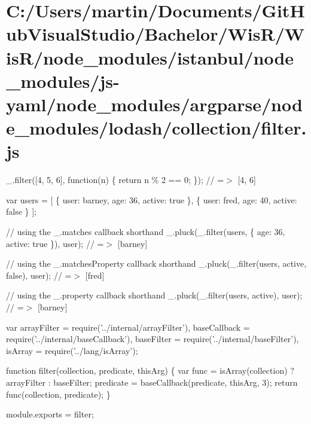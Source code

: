 \hypertarget{_c_1_2_users_2martin_2_documents_2_git_hub_visual_studio_2_bachelor_2_wis_r_2_wis_r_2node_module8bf19159f08a35f71152eec9f7ba8dad}{}\section{C\+:/\+Users/martin/\+Documents/\+Git\+Hub\+Visual\+Studio/\+Bachelor/\+Wis\+R/\+Wis\+R/node\+\_\+modules/istanbul/node\+\_\+modules/js-\/yaml/node\+\_\+modules/argparse/node\+\_\+modules/lodash/collection/filter.\+js}
\+\_\+.\+filter(\mbox{[}4, 5, 6\mbox{]}, function(n) \{ return n \% 2 == 0; \}); // =$>$ \mbox{[}4, 6\mbox{]}

var users = \mbox{[} \{ \textquotesingle{}user\textquotesingle{}\+: \textquotesingle{}barney\textquotesingle{}, \textquotesingle{}age\textquotesingle{}\+: 36, \textquotesingle{}active\textquotesingle{}\+: true \}, \{ \textquotesingle{}user\textquotesingle{}\+: \textquotesingle{}fred\textquotesingle{}, \textquotesingle{}age\textquotesingle{}\+: 40, \textquotesingle{}active\textquotesingle{}\+: false \} \mbox{]};

// using the {\ttfamily \+\_\+.\+matches} callback shorthand \+\_\+.\+pluck(\+\_\+.\+filter(users, \{ \textquotesingle{}age\textquotesingle{}\+: 36, \textquotesingle{}active\textquotesingle{}\+: true \}), \textquotesingle{}user\textquotesingle{}); // =$>$ \mbox{[}\textquotesingle{}barney\textquotesingle{}\mbox{]}

// using the {\ttfamily \+\_\+.\+matches\+Property} callback shorthand \+\_\+.\+pluck(\+\_\+.\+filter(users, \textquotesingle{}active\textquotesingle{}, false), \textquotesingle{}user\textquotesingle{}); // =$>$ \mbox{[}\textquotesingle{}fred\textquotesingle{}\mbox{]}

// using the {\ttfamily \+\_\+.\+property} callback shorthand \+\_\+.\+pluck(\+\_\+.\+filter(users, \textquotesingle{}active\textquotesingle{}), \textquotesingle{}user\textquotesingle{}); // =$>$ \mbox{[}\textquotesingle{}barney\textquotesingle{}\mbox{]}


\begin{DoxyCodeInclude}
var arrayFilter = require(\textcolor{stringliteral}{'../internal/arrayFilter'}),
    baseCallback = require(\textcolor{stringliteral}{'../internal/baseCallback'}),
    baseFilter = require(\textcolor{stringliteral}{'../internal/baseFilter'}),
    isArray = require(\textcolor{stringliteral}{'../lang/isArray'});

\textcolor{keyword}{function} filter(collection, predicate, thisArg) \{
  var func = isArray(collection) ? arrayFilter : baseFilter;
  predicate = baseCallback(predicate, thisArg, 3);
  \textcolor{keywordflow}{return} func(collection, predicate);
\}

module.exports = filter;
\end{DoxyCodeInclude}
 